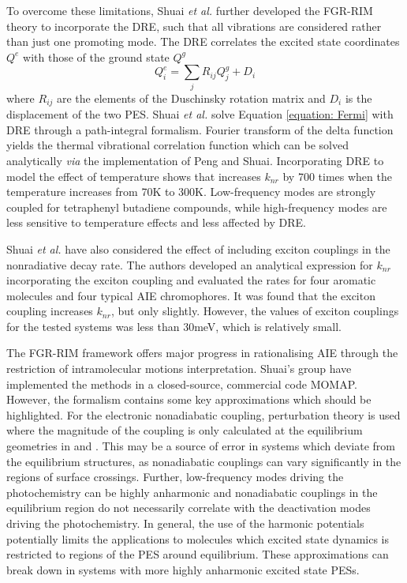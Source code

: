 To overcome these limitations, Shuai \textit{et al.} further developed the \ac{FGR-RIM} theory to incorporate the \ac{DRE}, such that all vibrations are considered rather than just one promoting mode.\cite{Yui2005,Peng2007a,Niu2010} The \ac{DRE} correlates the excited state coordinates $Q^{e}$ with those of the ground state $Q^{g}$
\begin{equation}
    Q^{e}_{i}=\sum_{j}R_{ij}Q^{g}_{j}+D_{i}
\end{equation}
where $R_{ij}$ are the elements of the Duschinsky rotation matrix and $D_{i}$ is the displacement of the two \ac{PES}. Shuai \textit{et al.} solve Equation \ref{equation: Fermi} with \ac{DRE} through a path-integral formalism.\cite{Peng2007a} Fourier transform of the delta function yields the thermal vibrational correlation function which can be solved analytically \textit{via} the implementation of Peng and Shuai.\cite{Peng2013}
Incorporating \ac{DRE} to model the effect of temperature shows that increases $k_{nr}$ by 700 times when the temperature increases from 70K to 300K.\cite{Peng2007} Low-frequency modes are strongly coupled for tetraphenyl butadiene compounds, while high-frequency modes are less sensitive to temperature effects and less affected by \ac{DRE}. 

Shuai \textit{et al.} have also considered the effect of including exciton couplings in the nonradiative decay rate.\cite{Li2017} The authors developed an analytical expression for $k_{nr}$ incorporating the exciton coupling and evaluated the rates for four aromatic molecules and four typical AIE chromophores. It was found that the exciton coupling increases $k_{nr}$, but only slightly. However, the values of exciton couplings for the tested systems was less than 30meV, which is relatively small.

The \ac{FGR-RIM} framework offers major progress in rationalising AIE through the restriction of intramolecular motions interpretation. Shuai's group have implemented the methods in a closed-source, commercial code MOMAP.\cite{Niu2018} However, the formalism contains some key approximations which should be highlighted. For the electronic nonadiabatic coupling, perturbation theory is used where the magnitude of the coupling is only calculated at the equilibrium geometries in \szero{} and \sone{}. This may be a source of error in systems which deviate from the equilibrium structures, as nonadiabatic couplings can vary significantly in the regions of surface crossings. Further, low-frequency modes driving the photochemistry can be highly anharmonic and nonadiabatic couplings in the equilibrium region do not necessarily correlate with the deactivation modes driving the photochemistry. In general, the use of the harmonic potentials potentially limits the applications to molecules which excited state dynamics is restricted to regions of the PES around equilibrium. These approximations can break down in systems with more highly anharmonic excited state \acp{PES}. 
